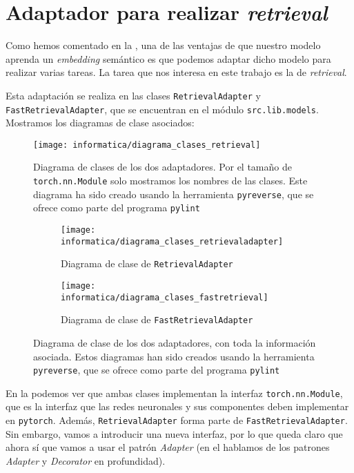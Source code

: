 \section{Adaptador para realizar \textit{retrieval}} \label{isubs:impl_retr_adapter}

Como hemos comentado en la , una de las ventajas de que nuestro modelo aprenda un \textit{embedding} semántico es que podemos adaptar dicho modelo para realizar varias tareas. La tarea que nos interesa en este trabajo es la de \textit{retrieval}.

Esta adaptación se realiza en las clases \lstinline{RetrievalAdapter} y \lstinline{FastRetrievalAdapter}, que se encuentran en el módulo \lstinline{src.lib.models}. Mostramos los diagramas de clase asociados:

\begin{figure}[H]
	\centering
	\texttt{[image: informatica/diagrama\_clases\_retrieval]}
	\caption{Diagrama de clases de los dos adaptadores. Por el tamaño de \lstinline{torch.nn.Module} solo mostramos los nombres de las clases. Este diagrama ha sido creado usando la herramienta \lstinline{pyreverse}, que se ofrece como parte del programa \lstinline{pylint}}
	\label{img:diagrama_clases_global_adaptadores}
\end{figure}

\begin{figure}[H]
	\centering
	\ajustarsubcaptions
	\begin{subfigure}{.6\textwidth}
		\centering
		\texttt{[image: informatica/diagrama\_clases\_retrievaladapter]}
		\caption{Diagrama de clase de \lstinline{RetrievalAdapter}}
	\end{subfigure}%
	\begin{subfigure}{.4\textwidth}
		\centering
		\texttt{[image: informatica/diagrama\_clases\_fastretrieval]}
		\caption{Diagrama de clase de \lstinline{FastRetrievalAdapter}}
	\end{subfigure}
	\caption{Diagrama de clase de los dos adaptadores, con toda la información asociada. Estos diagramas han sido creados usando la herramienta \lstinline{pyreverse}, que se ofrece como parte del programa \lstinline{pylint}}
	\label{img:diagramas_clase_concretos_adaptadores}
\end{figure}

En la  podemos ver que ambas clases implementan la interfaz \lstinline{torch.nn.Module}, que es la interfaz que las redes neuronales y sus componentes deben implementar en \lstinline{pytorch}. Además, \lstinline{RetrievalAdapter} forma parte de \lstinline{FastRetrievalAdapter}. Sin embargo, vamos a introducir una nueva interfaz, por lo que queda claro que ahora sí que vamos a usar el patrón \textit{Adapter} (en el  hablamos de los patrones \textit{Adapter} y \textit{Decorator} en profundidad).

